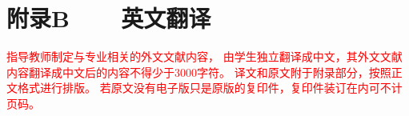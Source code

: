 

\chapter{附录B\ \ \ \ 英文翻译}

\textcolor{red}{指导教师制定与专业相关的外文文献内容，
	由学生独立翻译成中文，其外文文献内容翻译成中文后的内容不得少于3000字符。
	译文和原文附于附录部分，按照正文格式进行排版。
	若原文没有电子版只是原版的复印件，复印件装订在内可不计页码。}
